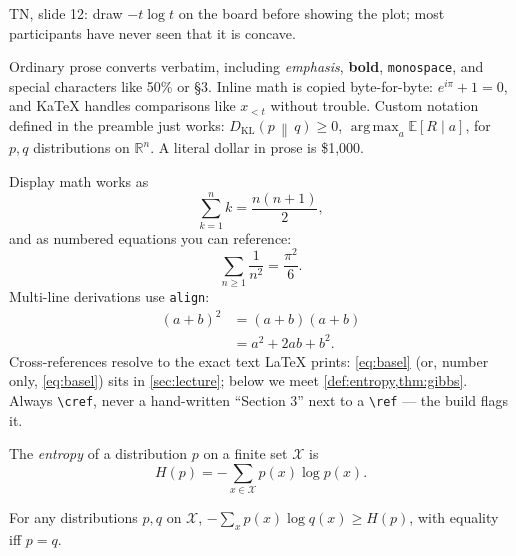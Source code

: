 \documentclass[11pt]{article}
\newcommand{\R}{\mathbb{R}}
\newcommand{\E}{\mathbb{E}}
\newcommand{\KL}[2]{D_{\mathrm{KL}}\!\left(#1 \,\middle\|\, #2\right)}
\DeclareMathOperator*{\argmax}{arg\,max}
\begin{document}
\begin{teachingnote}
TN, slide 12: draw $-t\log t$ on the board before showing the plot; most
participants have never seen that it is concave.
\end{teachingnote}

Ordinary prose converts verbatim, including \emph{emphasis}, \textbf{bold},
\texttt{monospace}, and special characters like 50\% or \S3. Inline math is
copied byte-for-byte: $e^{i\pi} + 1 = 0$, and KaTeX handles comparisons like
$x_{<t}$ without trouble. Custom notation defined in the preamble just works:
$\KL{p}{q} \geq 0$, $\argmax_{a} \E[R \mid a]$, for $p, q$ distributions on
$\R^n$. A literal dollar in prose is \$1,000.

Display math works as \[ \sum_{k=1}^{n} k = \frac{n(n+1)}{2}, \]
and as numbered equations you can reference:
\begin{equation}
  \label{eq:basel}
  \sum_{n \geq 1} \frac{1}{n^2} = \frac{\pi^2}{6}.
\end{equation}
Multi-line derivations use \texttt{align}:
\begin{align}
  (a+b)^2 &= (a+b)(a+b) \\
          &= a^2 + 2ab + b^2.
\end{align}
Cross-references resolve to the exact text LaTeX prints: \cref{eq:basel}
(or, number only, \eqref{eq:basel}) sits in \cref{sec:lecture}; below we
meet \cref{def:entropy,thm:gibbs}. Always \verb|\cref|, never a hand-written
``Section 3'' next to a \verb|\ref| — the build flags it.

\begin{definition}[entropy]
\label{def:entropy}
The \emph{entropy} of a distribution $p$ on a finite set $\mathcal{X}$ is
\[ H(p) = -\sum_{x \in \mathcal{X}} p(x) \log p(x). \]
\end{definition}

\begin{theorem}
\label{thm:gibbs}
For any distributions $p, q$ on $\mathcal{X}$,
$-\sum_x p(x) \log q(x) \geq H(p)$, with equality iff $p = q$.
\end{theorem}
\end{document}
